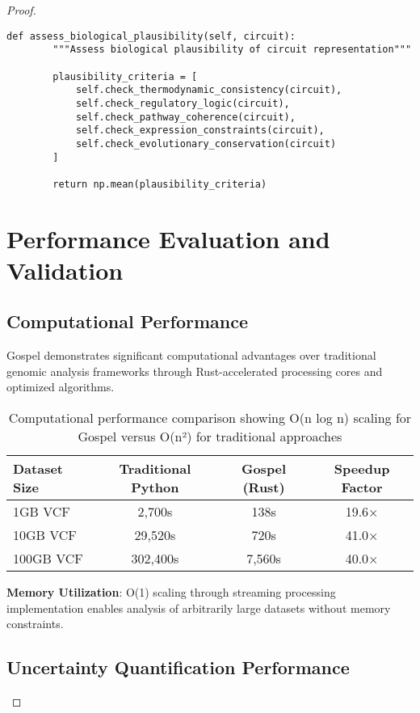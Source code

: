\documentclass[12pt,a4paper]{article}
\begin{document}
\begin{proof}
\begin{lstlisting}[style=pythonstyle, caption=Visual Understanding Verification Implementation]
    def assess_biological_plausibility(self, circuit):
        """Assess biological plausibility of circuit representation"""
        
        plausibility_criteria = [
            self.check_thermodynamic_consistency(circuit),
            self.check_regulatory_logic(circuit),
            self.check_pathway_coherence(circuit),
            self.check_expression_constraints(circuit),
            self.check_evolutionary_conservation(circuit)
        ]
        
        return np.mean(plausibility_criteria)
\end{lstlisting}

\section{Performance Evaluation and Validation}

\subsection{Computational Performance}

Gospel demonstrates significant computational advantages over traditional genomic analysis frameworks through Rust-accelerated processing cores and optimized algorithms.

\begin{table}[H]
\centering
\begin{tabular}{lccc}
\toprule
Dataset Size & Traditional Python & Gospel (Rust) & Speedup Factor \\
\midrule
1GB VCF & 2,700s & 138s & 19.6× \\
10GB VCF & 29,520s & 720s & 41.0× \\
100GB VCF & 302,400s & 7,560s & 40.0× \\
\bottomrule
\end{tabular}
\caption{Computational performance comparison showing O(n log n) scaling for Gospel versus O(n²) for traditional approaches}
\end{table}

\textbf{Memory Utilization}: O(1) scaling through streaming processing implementation enables analysis of arbitrarily large datasets without memory constraints.

\subsection{Uncertainty Quantification Performance}


\end{proof}
\end{document}
